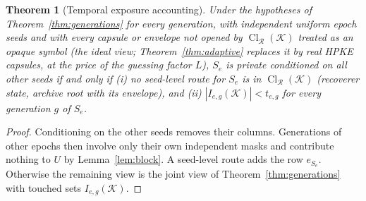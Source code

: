 \documentclass[pdflatex,sn-mathphys-num,twocolumn]{sn-jnl}
\theoremstyle{plain}
\newtheorem{theorem}{Theorem}
\theoremstyle{definition}
\newcommand{\Cl}{\operatorname{Cl}}
\begin{document}
\begin{theorem}[Temporal exposure accounting]\label{thm:temporal}
Under the hypotheses of Theorem~\ref{thm:generations} for every generation, with independent uniform epoch seeds and with every capsule or envelope not opened by $\Cl_{\mathcal R}(\mathcal K)$ treated as an opaque symbol (the ideal view; Theorem~\ref{thm:adaptive} replaces it by real HPKE capsules, at the price of the guessing factor $L$), $S_e$ is private conditioned on all other seeds if and only if (i) no seed-level route for $S_e$ is in $\Cl_{\mathcal R}(\mathcal K)$ (recoverer state, archive root with its envelope), and (ii) $|I_{e,g}(\mathcal K)|<t_{e,g}$ for every generation $g$ of $S_e$.
\end{theorem}
\begin{proof}
Conditioning on the other seeds removes their columns. Generations of other epochs then involve only their own independent masks and contribute nothing to $U$ by Lemma~\ref{lem:block}. A seed-level route adds the row $e_{S_e}$. Otherwise the remaining view is the joint view of Theorem~\ref{thm:generations} with touched sets $I_{e,g}(\mathcal K)$.
\end{proof}
\end{document}
